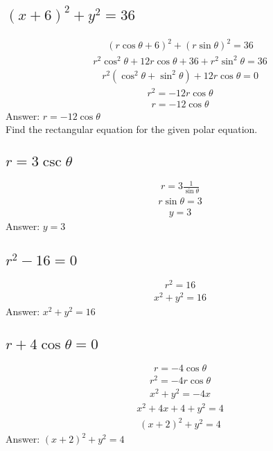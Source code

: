 \documentclass{article}
\begin{document}
\subsection{$(x + 6)^2 + y^2 = 36$}
\begin{align*}
	(r\cos{\theta} + 6)^2 + (r\sin{\theta})^2 = 36
\end{align*}
\begin{align*}
	r^2 \cos^2{\theta} + 12r\cos{\theta} + 36 + r^2 \sin^2{\theta} = 36
\end{align*}
\begin{align*}
	r^2 (\cos^2{\theta} + \sin^2{\theta}) + 12r\cos{\theta} = 0
\end{align*}
\begin{align*}
	r^2 = -12r\cos{\theta}
\end{align*}
\begin{align*}
	r = -12\cos{\theta}
\end{align*}
Answer: $r = -12\cos{\theta}$
\\[10pt]
Find the rectangular equation for the given polar equation.

\subsection{$r = 3 \csc{\theta}$}
\begin{align*}
	r = 3 \frac{1}{\sin{\theta}}
\end{align*}
\begin{align*}
	r\sin{\theta} = 3
\end{align*}
\begin{align*}
	y = 3
\end{align*}
Answer: $y = 3$

\subsection{$r^2 - 16 = 0$}
\begin{align*}
	r^2 = 16
\end{align*}
\begin{align*}
	x^2 + y^2 = 16
\end{align*}
Answer: $x^2 + y^2 = 16$

\subsection{$r + 4 \cos{\theta} = 0$}
\begin{align*}
	r = -4\cos{\theta}
\end{align*}
\begin{align*}
	r^2 = -4r\cos{\theta}
\end{align*}
\begin{align*}
	x^2 + y^2 = -4x
\end{align*}
\begin{align*}
	x^2 + 4x + 4 + y^2 = 4
\end{align*}
\begin{align*}
	(x + 2)^2 + y^2 = 4
\end{align*}
Answer: $(x + 2)^2 + y^2 = 4$
\end{document}
